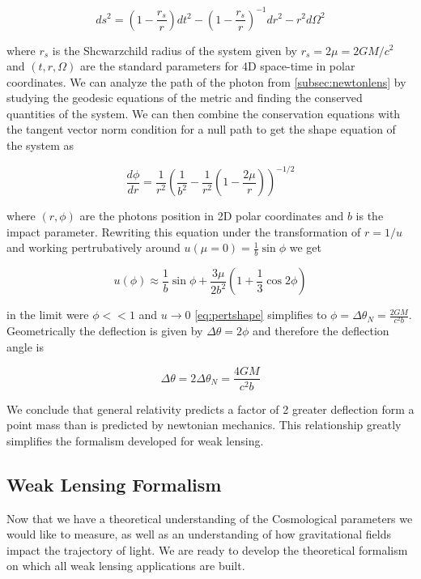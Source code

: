 \begin{equation}
  ds^2 = \left ( 1-\frac{r_s}{r} \right )  dt^2 - \left( 1-\frac{r_s}{r}\right) ^{-1} dr^2 -r^2 d\Omega^2
  \label{schwarz}
\end{equation}

where $r_s$ is the Shcwarzchild radius of the system given by $r_s=2 \mu = 2GM/c^2$ and $(t,r,\Omega)$ are the standard parameters for 4D space-time in polar coordinates. We can analyze the path of the photon from \autoref{subsec:newtonlens} by studying the geodesic equations of the metric and finding the conserved
quantities of the system. We can then combine the conservation equations with the tangent vector norm condition for a 
null path to get the shape equation of the system as 

\begin{equation}
  \frac{d\phi}{dr} = \frac{1}{r^2} \left(\frac{1}{b^2}- \frac{1}{r^2} \left(1-\frac{2\mu}{r}\right) \right)^{-1/2}
  \label{shapeeqbend}
\end{equation}

where $(r,\phi)$ are the photons position in 2D polar coordinates and $b$ is the impact parameter. Rewriting this equation
under the transformation of $r = 1/u$ and working pertrubatively around $u(\mu =0) = \frac{1}{b}\sin \phi
$ we get 

\begin{equation}
  u(\phi) \approx \frac{1}{b}\sin \phi + \frac{3\mu}{2b^2} \left(1+\frac{1}{3}\cos 2 \phi \right)
  \label{eq:pertshape}
\end{equation}

in the limit were $\phi << 1$ and $u \rightarrow 0$ \autoref{eq:pertshape} simplifies to $\phi = \Delta \theta_N =\frac{2GM}{c^2b} $. Geometrically the deflection is given by $\Delta \theta = 2\phi$ and therefore the deflection angle is

\begin{equation}
  \Delta \theta = 2\Delta \theta_N=\frac{4GM}{c^2b}
  \label{grbend}
\end{equation}

We conclude that general relativity predicts a factor of 2 greater deflection form a point mass than is predicted by newtonian mechanics. This relationship greatly simplifies the formalism developed for weak lensing. 

\subsection{Weak Lensing Formalism}
Now that we have a theoretical understanding of the Cosmological parameters we would like to measure, as well as an understanding of how gravitational fields impact the trajectory of light. We are ready to develop the theoretical formalism on which all weak lensing applications are built.

